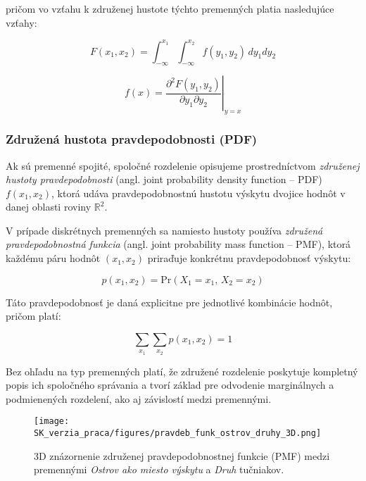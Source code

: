 pričom vo vzťahu k združenej hustote týchto premenných platia nasledujúce vzťahy:

\begin{equation}
F(x_1, x_2) = \int_{-\infty}^{x_1} \int_{-\infty}^{x_2} f(y_1, y_2) \, dy_1 dy_2
\end{equation}

\begin{equation}
f(x) = \left. \frac{\partial^2 F(y_1, y_2)}{\partial y_1 \partial y_2} \right|_{y = x}
\end{equation}

\subsubsection{Združená hustota pravdepodobnosti (PDF)}\label{subsec:joint_pdf}

Ak sú premenné spojité, spoločné rozdelenie opisujeme prostredníctvom \textit{združenej hustoty pravdepodobnosti} (angl. joint probability density function – PDF) $f(x_1, x_2)$, ktorá udáva pravdepodobnostnú hustotu výskytu dvojice hodnôt v danej oblasti roviny $\mathbb{R}^2$.

V prípade diskrétnych premenných sa namiesto hustoty používa \textit{združená pravdepodobnostná funkcia} (angl. joint probability mass function – PMF), ktorá každému páru hodnôt $(x_1, x_2)$ priraďuje konkrétnu pravdepodobnosť výskytu: 

\begin{equation}
p(x_1, x_2) = \mathrm{Pr}(X_1 = x_1,\, X_2 = x_2)
\end{equation}

Táto pravdepodobnosť je daná explicitne pre jednotlivé kombinácie hodnôt, pričom platí:

\begin{equation}
\sum_{x_1} \sum_{x_2} p(x_1, x_2) = 1
\end{equation}

Bez ohľadu na typ premenných platí, že združené rozdelenie poskytuje kompletný popis ich spoločného správania a tvorí základ pre odvodenie marginálnych a podmienených rozdelení, ako aj závislostí medzi premennými.

\begin{figure}[H]
    \centering
    \texttt{[image: SK\_verzia\_praca/figures/pravdeb\_funk\_ostrov\_druhy\_3D.png]}
    \caption{3D znázornenie združenej pravdepodobnostnej funkcie (PMF) medzi premennými \textit{Ostrov ako miesto výskytu} a \textit{Druh} tučniakov.}
    \label{fig:miesto_druh_joint_density}
\end{figure}

